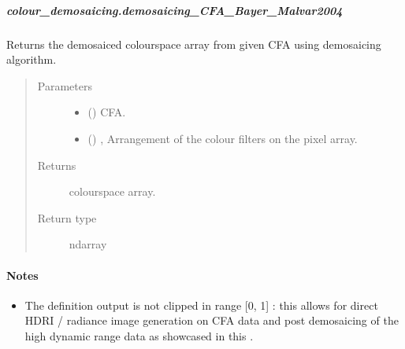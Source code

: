 \documentclass[letterpaper,10pt,english]{sphinxmanual}
\begin{document}
\subparagraph{colour\_demosaicing.demosaicing\_CFA\_Bayer\_Malvar2004}
\label{\detokenize{generated/colour_demosaicing.demosaicing_CFA_Bayer_Malvar2004:colour-demosaicing-demosaicing-cfa-bayer-malvar2004}}\label{\detokenize{generated/colour_demosaicing.demosaicing_CFA_Bayer_Malvar2004::doc}}

\begin{fulllineitems}
\label{\detokenize{generated/colour_demosaicing.demosaicing_CFA_Bayer_Malvar2004:colour_demosaicing.demosaicing_CFA_Bayer_Malvar2004}}
Returns the demosaiced  colourspace array from given  CFA using
 demosaicing algorithm.
\begin{quote}\begin{description}
\item[{Parameters}] \leavevmode\begin{itemize}
\item {} 
 () \textendash{}  CFA.

\item {} 
 (\sphinxstyleliteralemphasis{, }) \textendash{} ,
Arrangement of the colour filters on the pixel array.

\end{itemize}

\item[{Returns}] \leavevmode
{} colourspace array.

\item[{Return type}] \leavevmode
ndarray

\end{description}\end{quote}
\paragraph{Notes}
\begin{itemize}
\item {} 
The definition output is not clipped in range {[}0, 1{]} : this allows for
direct HDRI / radiance image generation on  CFA data and post
demosaicing of the high dynamic range data as showcased in this
.


\end{itemize}
\end{fulllineitems}
\end{document}
